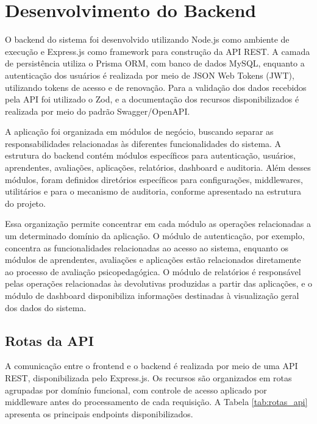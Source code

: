 \chapter[Desenvolvimento do Backend]{Desenvolvimento do Backend} \label{capitulo8}

O backend do sistema foi desenvolvido utilizando Node.js como ambiente de execução e Express.js como framework para construção da API REST. A camada de persistência utiliza o Prisma ORM, com banco de dados MySQL, enquanto a autenticação dos usuários é realizada por meio de JSON Web Tokens (JWT), utilizando tokens de acesso e de renovação. Para a validação dos dados recebidos pela API foi utilizado o Zod, e a documentação dos recursos disponibilizados é realizada por meio do padrão Swagger/OpenAPI.

A aplicação foi organizada em módulos de negócio, buscando separar as responsabilidades relacionadas às diferentes funcionalidades do sistema. A estrutura do backend contém módulos específicos para autenticação, usuários, aprendentes, avaliações, aplicações, relatórios, dashboard e auditoria. Além desses módulos, foram definidos diretórios específicos para configurações, middlewares, utilitários e para o mecanismo de auditoria, conforme apresentado na estrutura do projeto.

Essa organização permite concentrar em cada módulo as operações relacionadas a um determinado domínio da aplicação. O módulo de autenticação, por exemplo, concentra as funcionalidades relacionadas ao acesso ao sistema, enquanto os módulos de aprendentes, avaliações e aplicações estão relacionados diretamente ao processo de avaliação psicopedagógica. O módulo de relatórios é responsável pelas operações relacionadas às devolutivas produzidas a partir das aplicações, e o módulo de dashboard disponibiliza informações destinadas à visualização geral dos dados do sistema.

\section{Rotas da API}

A comunicação entre o frontend e o backend é realizada por meio de uma API REST, disponibilizada pelo Express.js. Os recursos são organizados em rotas agrupadas por domínio funcional, com controle de acesso aplicado por middleware antes do processamento de cada requisição. A Tabela \ref{tab:rotas_api} apresenta os principais endpoints disponibilizados.

